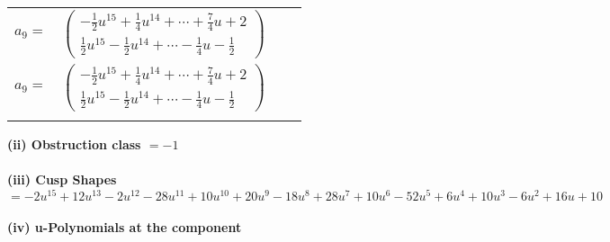 \documentclass[1p]{elsarticle_modified}
\theoremstyle{definition}
\begin{document}
\begin{tabular}{m{7pt} m{180pt} m{7pt} m{180pt} }
\flushright $a_{9}=$&$\begin{pmatrix}-\frac{1}{2} u^{15}+\frac{1}{4} u^{14}+\cdots+\frac{7}{4} u+2\\\frac{1}{2} u^{15}-\frac{1}{2} u^{14}+\cdots-\frac{1}{4} u-\frac{1}{2}\end{pmatrix}$\\ \flushright $a_{9}=$&$\begin{pmatrix}-\frac{1}{2} u^{15}+\frac{1}{4} u^{14}+\cdots+\frac{7}{4} u+2\\\frac{1}{2} u^{15}-\frac{1}{2} u^{14}+\cdots-\frac{1}{4} u-\frac{1}{2}\end{pmatrix}$\\&\end{tabular}
\flushleft \textbf{(ii) Obstruction class $= -1$}\\~\\
\flushleft \textbf{(iii) Cusp Shapes $= -2 u^{15}+12 u^{13}-2 u^{12}-28 u^{11}+10 u^{10}+20 u^9-18 u^8+28 u^7+10 u^6-52 u^5+6 u^4+10 u^3-6 u^2+16 u+10$}\\~\\
\newpage\renewcommand{\arraystretch}{1}
\flushleft \textbf{(iv) u-Polynomials at the component}\newline \\
\end{document}
